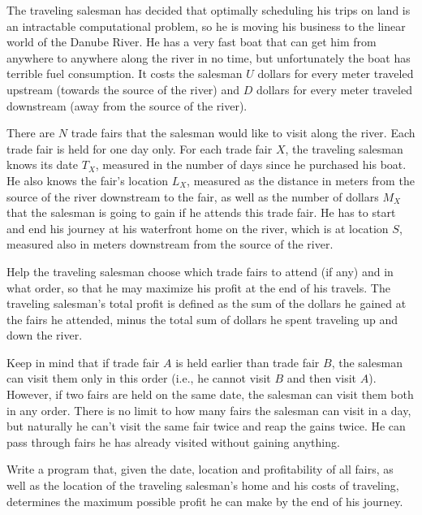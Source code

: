 The traveling salesman has decided that optimally scheduling his trips on land is an intractable computational problem, so he is moving his business to the linear world of the Danube River. He has a very fast boat that can get him from anywhere to anywhere along the river in no time, but unfortunately the boat has terrible fuel consumption. It costs the salesman $U$ dollars for every meter traveled upstream (towards the source of the river) and $D$ dollars for every meter traveled downstream (away from the source of the river).

There are $N$ trade fairs that the salesman would like to visit along the river. Each trade fair is held for one day only. For each trade fair $X$, the traveling salesman knows its date $T_X$, measured in the number of days since he purchased his boat. He also knows the fair's location $L_X$, measured as the distance in meters from the source of the river downstream to the fair, as well as the number of dollars $M_X$ that the salesman is going to gain if he attends this trade fair. He has to start and end his journey at his waterfront home on the river, which is at location $S$,
measured also in meters downstream from the source of the river.


Help the traveling salesman choose which trade fairs to attend (if any) and in what order, so that he may maximize his profit at the end of his travels. The traveling salesman's total profit is defined as the sum of the dollars he gained at the fairs he attended, minus the total sum of dollars he spent traveling up and down the river.

Keep in mind that if trade fair $A$ is held earlier than trade fair $B$, the salesman can visit them only in this order (i.e., he cannot visit $B$ and then visit $A$). 
 However, if two fairs are held on the same date, the salesman can visit them both in any order. There is no limit to how many fairs the salesman can visit in a day, but naturally he can't visit the same fair twice and reap the gains twice. He can pass through fairs he has already visited without gaining anything.

Write a program that, given the date, location and profitability of all fairs, as well as the location of the traveling salesman's home and his costs of traveling, determines the maximum possible profit he can make by the end of his journey. 

